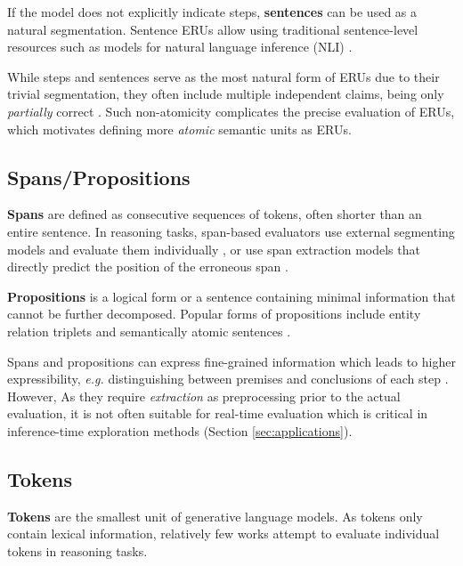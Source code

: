 If the model does not explicitly indicate steps, \textbf{sentences} \citep{zha-etal-2023-alignscore, xie2024montecarlotreesearch} can be used as a natural segmentation. Sentence ERUs allow using traditional sentence-level resources such as models for natural language inference (NLI) \citep{zha-etal-2023-alignscore}.

While steps and sentences serve as the most natural form of ERUs due to their trivial segmentation, they often include multiple independent claims, being only \textit{partially} correct \citep{min-etal-2023-factscore, prasad-etal-2023-receval}. Such non-atomicity complicates the precise evaluation of ERUs, which motivates defining more \textit{atomic} semantic units as ERUs.

\subsection{Spans/Propositions}

\textbf{Spans} are defined as consecutive sequences of tokens, often shorter than an entire sentence. In reasoning tasks, span-based evaluators use external segmenting models and evaluate them individually \citep{prasad-etal-2023-receval}, or use span extraction models that directly predict the position of the erroneous span \citep{niu2024ragtruthhallucinationcorpusdeveloping}.

\textbf{Propositions} is a logical form or a sentence containing minimal information that cannot be further decomposed. Popular forms of propositions include entity relation triplets \citep{wang-etal-2024-boosting-language, nguyen-etal-2024-direct} and semantically atomic sentences \citep{min-etal-2023-factscore, akbar-etal-2024-hallumeasure}.

Spans and propositions can express fine-grained information which leads to higher expressibility, \textit{e.g.} distinguishing between premises and conclusions of each step \citep{prasad-etal-2023-receval}. However, As they require \textit{extraction} as preprocessing prior to the actual evaluation, it is not often suitable for real-time evaluation which is critical in inference-time exploration methods (Section \ref{sec:applications}).

\subsection{Tokens}

\textbf{Tokens} are the smallest unit of generative language models. As tokens only contain lexical information, relatively few works attempt to evaluate individual tokens in reasoning tasks.


